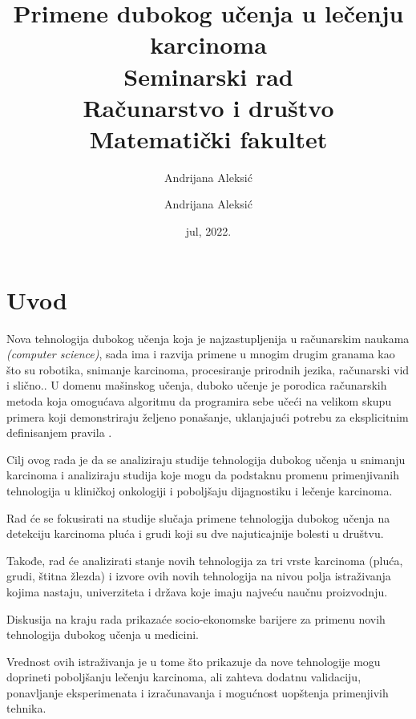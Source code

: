 \documentclass[a4paper]{article}
\author{Andrijana Aleksić}
\begin{document}
\title{Primene dubokog učenja u lečenju 
karcinoma\\ 

\bigskip
\small{Seminarski rad
\\Računarstvo i društvo
\\ Matematički fakultet}}

\author{Andrijana Aleksić}
\date{jul, 2022.}
\maketitle



\newpage

\tableofcontents

\newpage

\section{Uvod}
\label{sec:uvod}
Nova tehnologija dubokog učenja koja je najzastupljenija u računarskim naukama \emph{(computer science)}, sada ima i razvija primene u mnogim drugim granama kao što su robotika, snimanje karcinoma, procesiranje prirodnih jezika, računarski vid i slično.\cite{goodfellow}.
U domenu mašinskog učenja, duboko učenje je porodica računarskih metoda koja omogućava algoritmu da programira sebe učeći na velikom skupu primera koji demonstriraju željeno ponašanje, uklanjajući potrebu za eksplicitnim definisanjem pravila \cite{lafrate}.

Cilj ovog rada je da se analiziraju studije tehnologija dubokog učenja u snimanju karcinoma i analiziraju studija koje mogu da podstaknu promenu primenjivanih tehnologija u kliničkoj onkologiji i poboljšaju dijagnostiku i lečenje karcinoma.

Rad će se fokusirati na studije slučaja primene tehnologija dubokog učenja na detekciju karcinoma pluća i grudi koji su dve najuticajnije bolesti u društvu. 

Takođe, rad će analizirati stanje novih tehnologija za tri vrste karcinoma (pluća, grudi, štitna žlezda) i izvore ovih novih tehnologija na nivou polja istraživanja kojima nastaju, univerziteta i država koje imaju najveću naučnu proizvodnju. 

Diskusija na kraju rada prikazaće socio-ekonomske barijere za primenu novih tehnologija dubokog učenja u medicini.

Vrednost ovih istraživanja je u tome što prikazuje da nove tehnologije mogu doprineti poboljšanju lečenju karcinoma, ali zahteva dodatnu validaciju, ponavljanje eksperimenata i izračunavanja i mogućnost uopštenja primenjivih tehnika.
\end{document}
